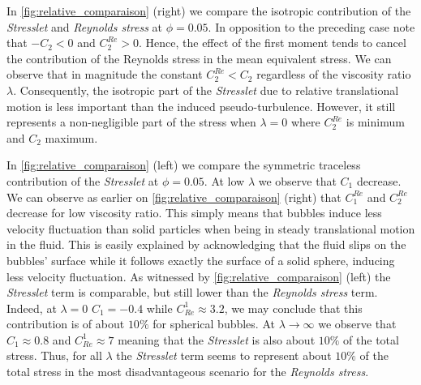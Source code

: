In \ref{fig:relative_comparaison} (right) we compare the isotropic contribution of the \textit{Stresslet} and \textit{Reynolds stress} at $\phi =0.05$. 
In opposition to the preceding case note that $ - C_2<0$ and $C_2^{Re} > 0$.  
Hence, the effect of the first moment tends to cancel the contribution of the Reynolds stress in the mean equivalent stress. 
We can observe that in magnitude the constant $C^{Re}_2 < C_2$ regardless of the viscosity ratio $\lambda$. 
Consequently, the isotropic part of the \textit{Stresslet} due to relative translational motion is less important than the induced pseudo-turbulence.
However, it still represents a non-negligible part of the stress when $\lambda = 0$ where $C^{Re}_2$ is minimum and $C_2$ maximum. 


In \ref{fig:relative_comparaison} (left) we compare the symmetric traceless contribution of the \textit{Stresslet} at $\phi =0.05$. 
At low $\lambda$ we observe that $C_1$ decrease. 
We can observe as earlier on \ref{fig:relative_comparaison} (right) that $C^{Re}_1$ and $C^{Re}_2$ decrease for low viscosity ratio. 
This simply means that bubbles induce less velocity fluctuation than solid particles when being in steady translational motion in the fluid. 
This is easily explained by acknowledging that the fluid slips on the bubbles' surface while it follows exactly the surface of a solid sphere, inducing less velocity fluctuation. 
As witnessed by \ref{fig:relative_comparaison} (left) the \textit{Stresslet} term is comparable, but still lower than the \textit{Reynolds stress} term.
Indeed, at $\lambda = 0$ $C_1 = - 0.4$ while $C^1_{Re} \approx 3.2$, we may conclude that this contribution is of about $10\%$ for spherical bubbles.
At $\lambda \to \infty$ we observe that $C_1 \approx 0.8$ and $C^1_{Re}\approx 7$ meaning that the \textit{Stresslet} is also about $10\%$ of the total stress.
Thus, for all $\lambda$ the \textit{Stresslet} term seems to represent about $10\%$ of the total stress in the most disadvantageous scenario for the \textit{Reynolds stress}. 

